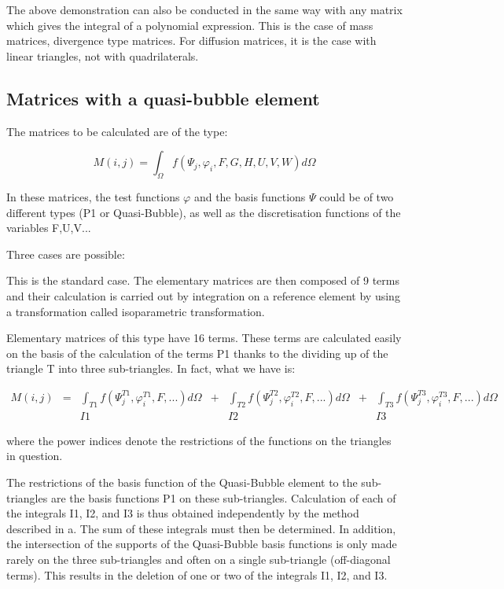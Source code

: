 The above demonstration can also be conducted in the same way with any matrix
which gives the integral of a polynomial expression. This is the case of mass
matrices, divergence type matrices. For diffusion matrices, it is the case with
linear triangles, not with quadrilaterals.

\subsection{Matrices with a quasi-bubble element}

The matrices to be calculated are of the type:


\[M(i,j)=\int _{\Omega }f(\Psi _{j} ,\varphi _{i} ,F,G,H,U,V,W)d\Omega  \]

In these matrices, the test functions $\varphi$ and the basis functions $\Psi$
could be of two different types (P1 or Quasi-Bubble), as well as the
discretisation functions of the variables F,U,V...

Three cases are possible:


This is the standard case. The elementary matrices are then composed of 9 terms
and their calculation is carried out by integration on a reference element by
using a transformation called isoparametric transformation.


Elementary matrices of this type have 16 terms. These terms are calculated
easily on the basis of the calculation of the terms P1 thanks to the dividing
up of the triangle T into three sub-triangles. In fact, what we have is:

\[
\begin{array}{ccccccc}
M(i,j) & = & \int _{T1}f(\Psi _{j}^{T1} ,\varphi _{i}^{T1} ,F,...)d\Omega & + & \int _{T2}f(\Psi _{j}^{T2} ,\varphi _{i}^{T2} ,F,...)d\Omega & + & \int _{T3}f(\Psi _{j}^{T3} ,\varphi _{i}^{T3} ,F,...)d\Omega \\
       &   &   I1                                                         &   &    I2                                                        &   &   I3
\end{array}
\]

where the power indices denote the restrictions of the functions on the
triangles in question.

The restrictions of the basis function of the Quasi-Bubble element to the
sub-triangles are the basis functions P1 on these sub-triangles. Calculation of
each of the integrals I1, I2, and I3 is thus obtained independently by the
method described in a. The sum of these integrals must then be determined. In
addition, the intersection of the supports of the Quasi-Bubble basis functions
is only made rarely on the three sub-triangles and often on a single
sub-triangle (off-diagonal terms). This results in the deletion of one or two
of the integrals I1, I2, and I3.

